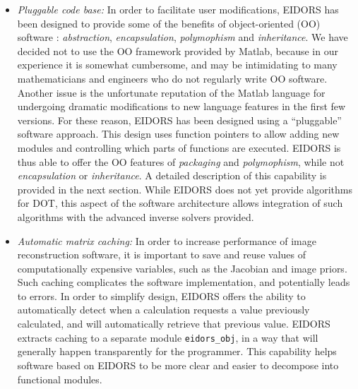 \documentclass[12pt]{iopart}
\begin{document}
\begin{itemize}
  \item {\em Pluggable code base:}
In order to facilitate user modifications, EIDORS
has been designed to provide some of the benefits of
object-oriented (OO) software \cite{Gamma_etal_1995}:
{\em abstraction}, {\em encapsulation}, 
{\em polymophism} and {\em inheritance}.
We have decided not to
use the OO framework provided by Matlab, because
in our experience it is somewhat cumbersome,
and may be intimidating
to many mathematicians and engineers who do not 
regularly write OO software.
Another issue is the unfortunate reputation of
the Matlab language for undergoing dramatic modifications to new
language features in the first few versions.
For these reason, EIDORS has been designed using
a  ``pluggable'' software approach.
This design uses function
pointers to allow adding new modules and controlling
which parts of functions are executed.
EIDORS is thus able to offer the OO features 
of {\em packaging} and {\em polymophism}, while
not {\em encapsulation} or {\em inheritance}.
A detailed description of this capability is
provided in the next section.
While EIDORS does not yet provide algorithms for DOT,
this aspect of the software architecture allows integration of such
algorithms with the advanced inverse solvers provided.


  \item {\em Automatic matrix caching:}
In order to increase
performance of image reconstruction software, it is important to save
and reuse values of 
computationally expensive variables, such as the Jacobian and image priors.
Such caching complicates the software implementation, and
potentially leads to errors. In order to simplify design, EIDORS
offers the ability to automatically detect when a calculation
requests a value previously calculated, and will automatically
retrieve that previous value.
EIDORS extracts caching to a separate module {\tt eidors\_obj},
in a way that will generally happen transparently for the
programmer. This capability helps software based on EIDORS
to be more clear and easier to decompose into functional
modules.



\end{itemize}
\end{document}
